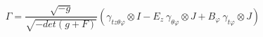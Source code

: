 \begin{equation}
\Gamma=
\frac{\sqrt{-g}}{\sqrt{-det(g+F)}}(\gamma_{tz\theta\varphi}\otimes I - 
E_z\ \gamma_{\theta\varphi}\otimes J +
B_{\varphi}\ \gamma_{t\varphi}\otimes J)
\label{g}
\end{equation}

